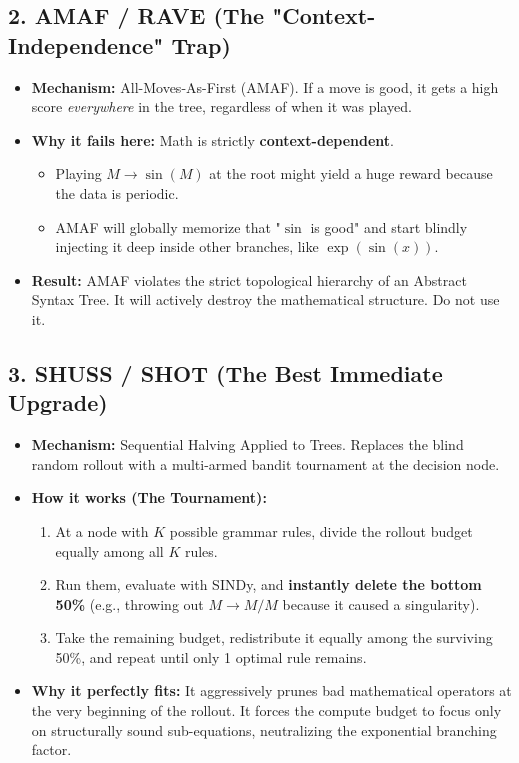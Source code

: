 \documentclass[11pt,a4paper]{article}
\begin{document}
\subsection*{2. AMAF / RAVE (The "Context-Independence" Trap)}
\begin{itemize}
    \item \textbf{Mechanism:} All-Moves-As-First (AMAF). If a move is good, it gets a high score \textit{everywhere} in the tree, regardless of when it was played.
    \item \textbf{Why it fails here:} Math is strictly \textbf{context-dependent}.
    \begin{itemize}
        \item Playing $M \rightarrow \sin(M)$ at the root might yield a huge reward because the data is periodic.
        \item AMAF will globally memorize that "$\sin$ is good" and start blindly injecting it deep inside other branches, like $\exp(\sin(x))$.
    \end{itemize}
    \item \textbf{Result:} AMAF violates the strict topological hierarchy of an Abstract Syntax Tree. It will actively destroy the mathematical structure. Do not use it.
\end{itemize}

\subsection*{3. SHUSS / SHOT (The Best Immediate Upgrade)}
\begin{itemize}
    \item \textbf{Mechanism:} Sequential Halving Applied to Trees. Replaces the blind random rollout with a multi-armed bandit tournament at the decision node.
    \item \textbf{How it works (The Tournament):}
    \begin{enumerate}
        \item At a node with $K$ possible grammar rules, divide the rollout budget equally among all $K$ rules.
        \item Run them, evaluate with SINDy, and \textbf{instantly delete the bottom 50\%} (e.g., throwing out $M \rightarrow M / M$ because it caused a singularity).
        \item Take the remaining budget, redistribute it equally among the surviving 50\%, and repeat until only 1 optimal rule remains.
    \end{enumerate}
    \item \textbf{Why it perfectly fits:} It aggressively prunes bad mathematical operators at the very beginning of the rollout. It forces the compute budget to focus only on structurally sound sub-equations, neutralizing the exponential branching factor.
\end{itemize}
\end{document}
